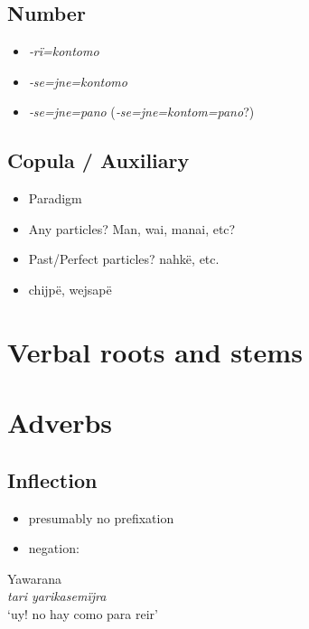 \documentclass{memoir}
\begin{document}
\section{Number}

\begin{itemize}
\tightlist
\item
  \emph{‑rï=kontomo}
\item
  \emph{‑se=jne=kontomo}
\item
  \emph{‑se=jne=pano} (\emph{‑se=jne=kontom=pano}?)
\end{itemize}

\section{Copula / Auxiliary}

\begin{itemize}
\tightlist
\item
  Paradigm
\item
  Any particles? Man, wai, manai, etc?
\item
  Past/Perfect particles? nahkë, etc.
\item
  chijpë, wejsapë
\end{itemize}

\chapter{\texorpdfstring{Verbal roots and stems
\label{derbderiv}}{Verbal roots and stems }}

\chapter{\texorpdfstring{Adverbs \label{adverbs}}{Adverbs }}

\section{Inflection}

\begin{itemize}
\tightlist
\item
  presumably no prefixation
\item
  negation:
\end{itemize}

\ex Yawarana \\
\label{convrisamaj-52}    \textit{tari yarikasemïjra }\\
        ‘uy! no hay como para reir’ \xe
\end{document}
